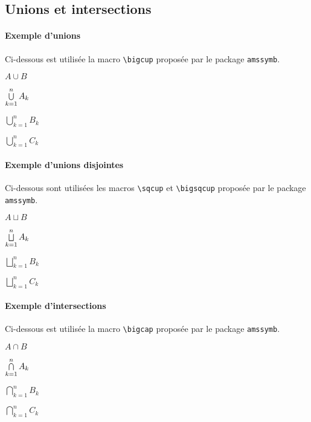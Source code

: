 \documentclass[12pt,a4paper]{article}
\newcommand\env[1]{\texttt{#1}}
\newcommand\macro[1]{\env{\textbackslash{}#1}}
\theoremstyle{definition}
\begin{document}

\subsection{Unions et intersections}

\paragraph{Exemple d'unions}

Ci-dessous est utilisée la macro \macro{bigcup} proposée par le package \verb+amssymb+.

\begin{latexex}
$A \cup B$

$\dcup_{k=1}^{n} A_k$

$\bigcup_{k=1}^{n} B_k$

$\displaystyle \bigcup_{k=1}^{n} C_k$
\end{latexex}




\paragraph{Exemple d'unions disjointes}

Ci-dessous sont utilisées les macros \macro{sqcup} et \macro{bigsqcup} proposée par le package \verb+amssymb+.

\begin{latexex}
$A\sqcup B$

$\dsqcup_{k=1}^{n} A_k$

$\bigsqcup_{k=1}^{n} B_k$

$\displaystyle \bigsqcup_{k=1}^{n} C_k$
\end{latexex}




\paragraph{Exemple d'intersections}

Ci-dessous est utilisée la macro \macro{bigcap} proposée par le package \verb+amssymb+.

\begin{latexex}
$A \cap B$

$\dcap_{k=1}^{n} A_k$

$\bigcap_{k=1}^{n} B_k$

$\displaystyle \bigcap_{k=1}^{n} C_k$
\end{latexex}
\end{document}

